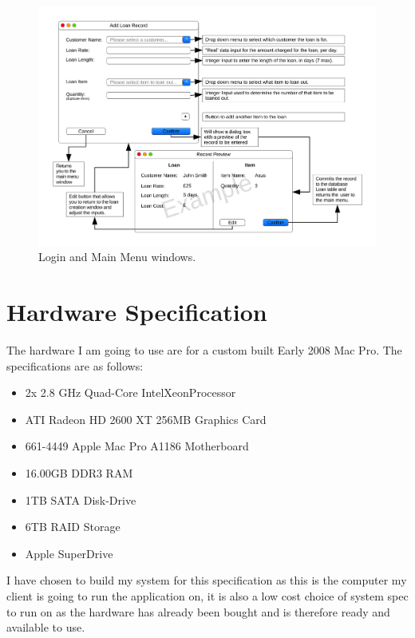 \begin{landscape}
\newpage

\begin{figure}[H]
    \begin{center}
        \includegraphics[width=500px]{./Design/user_interface/Add_loan_record_interface.pdf}
    \end{center}
    \caption{Login and Main Menu windows.} \label{fig:print_function_result}
\end{figure}

\end{landscape}

\section{Hardware Specification}

The hardware I am going to use are for a custom built Early 2008 Mac Pro. The specifications are as follows:
\begin{itemize}
    \item 2x 2.8 GHz Quad-Core Intel\textregistered Xeon\texttrademark Processor
    \item ATI Radeon HD 2600 XT 256MB Graphics Card
    \item 661-4449 Apple Mac Pro A1186 Motherboard
    \item 16.00GB DDR3 RAM
    \item 1TB SATA Disk-Drive
    \item 6TB RAID Storage
    \item Apple SuperDrive \\
\end{itemize}

I have chosen to build my system for this specification as this is the computer my client is going to run the application on, it is also a low cost choice of system spec to run on as the hardware has already been bought and is therefore ready and available to use.

